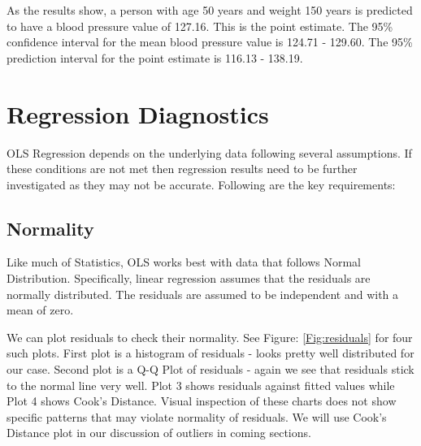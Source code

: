 \documentclass[10pt, letterpaper, twoside]{memoir}\usepackage{knitr}
\begin{document}
As the results show, a person with age 50 years and weight 150 years is predicted to have a blood pressure value of 127.16. This is the point estimate. The 95\% confidence interval for the mean blood pressure value is 124.71 - 129.60. The 95\% prediction interval for the point estimate is 116.13 - 138.19. 

\section{Regression Diagnostics}

OLS Regression depends on the underlying data following several assumptions. If these conditions are not met then regression results need to be further investigated as they may not be accurate. Following are the key requirements:

\subsection{Normality}

Like much of Statistics, OLS works best with data that follows Normal Distribution. Specifically, linear regression assumes that the residuals are normally distributed. The residuals are assumed to be independent and with a mean of zero.

We can plot residuals to check their normality. See Figure: \ref{Fig:residuals} for four such plots. First plot is a histogram of residuals - looks pretty well distributed for our case. Second plot is a Q-Q Plot of residuals - again we see that residuals stick to the normal line very well. Plot 3 shows residuals against fitted values while Plot 4 shows Cook's Distance. Visual inspection of these charts does not show specific patterns that may violate normality of residuals. We will use Cook's Distance plot in our discussion of outliers in coming sections.
\end{document}

